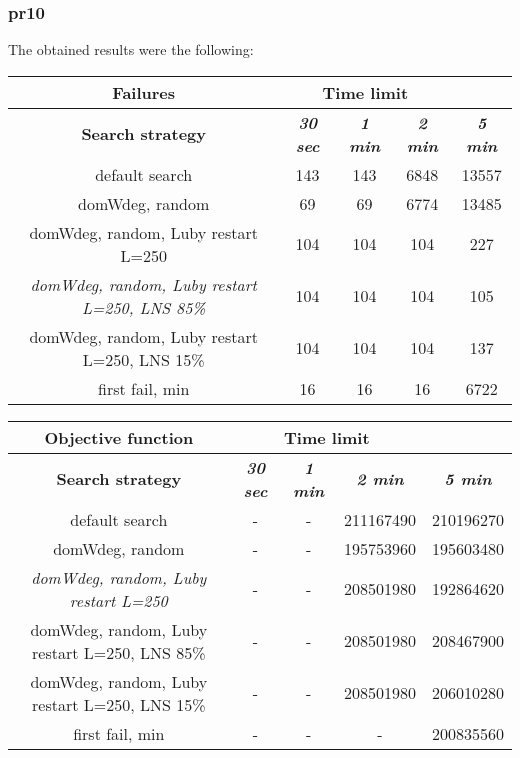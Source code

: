 \subsubsection{pr10}
The obtained results were the following:
{
\renewcommand{\arraystretch}{2}
\begin{longtable}[h]{| c | c | c | c | c |}
    \hline
    \textbf{Failures} & \multicolumn{3}{c}{Time limit} & \\
    \hline
    \textbf{Search strategy} & \textbf{\textit{30 sec}} & \textbf{\textit{1 min}} & \textbf{\textit{2 min}} & \textbf{\textit{5 min}} \\
    \hline
    \endhead
    default search                                         & 143 &  143 &  6848 & 13557 \\
    \hline
    domWdeg, random                                        &  69 &   69 &  6774 & 13485 \\
    \hline
    domWdeg, random, Luby restart L=250                    & 104 &  104 &  104 &    227 \\
    \hline
    \textit{domWdeg, random, Luby restart L=250, LNS 85\%} & 104 &  104 &  104 &    105 \\
    \hline
    domWdeg, random, Luby restart L=250, LNS 15\%          & 104 &  104 &  104 &    137 \\
    \hline
    first fail, min                                        &  16 &   16 &   16 &   6722 \\
    \hline
\end{longtable}
}

{
\renewcommand{\arraystretch}{2}
\begin{longtable}[h]{| c | c | c | c | c |}
    \hline
    \textbf{Objective function} & \multicolumn{3}{c}{Time limit} & \\
    \hline
    \textbf{Search strategy} & \textbf{\textit{30 sec}} & \textbf{\textit{1 min}} & \textbf{\textit{2 min}} & \textbf{\textit{5 min}} \\
    \hline
    \endhead
    default search                                & - & - & 211167490 & 210196270 \\
    \hline
    domWdeg, random                               & - & - & 195753960 & 195603480 \\
    \hline
    \textit{domWdeg, random, Luby restart L=250}  & - & - & 208501980 & 192864620 \\
    \hline
    domWdeg, random, Luby restart L=250, LNS 85\% & - & - & 208501980 & 208467900 \\
    \hline
    domWdeg, random, Luby restart L=250, LNS 15\% & - & - & 208501980 & 206010280 \\
    \hline
    first fail, min                               & - & - &         - & 200835560 \\
    \hline
\end{longtable}
}